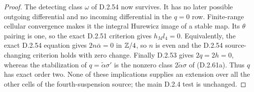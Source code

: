 \begin{proof}
The detecting class $\omega$ of D.2.54 now survives.
It has no later possible outgoing differential and no
incoming differential in the $q=0$ row.  Finite-range
cellular convergence makes it the integral Hurewicz
image of a stable map.  Its $\theta$ pairing is one,
so the exact D.2.51 criterion gives $h_Ml_4=0$.
Equivalently, the exact D.2.54 equation gives
$2n\bar\alpha=0$ in $\mathbb Z/4$, so $n$ is even and the
D.2.54 source-changing criterion holds with zero change.
Finally D.2.53 gives $2q=2h=0$, whereas the stabilization
of $q=\widetilde\alpha\sigma'$ is the nonzero class
$2\widetilde\alpha\sigma$ of \textup{(D.2.61a)}.
Thus $q$ has exact order two.
None of these implications supplies an extension over
all the other cells of the fourth-suspension source;
the main D.2.4 test is unchanged.
\end{proof}

